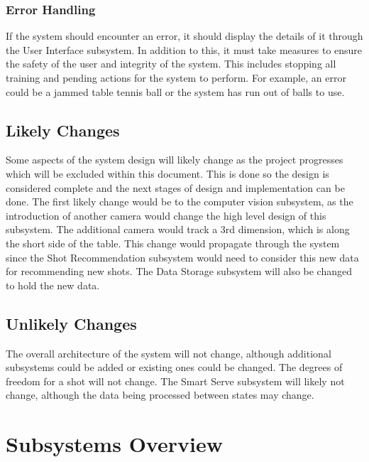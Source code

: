 \documentclass[11pt]{article}
\begin{document}
\subsubsection{Error Handling}
If the system should encounter an error, it should display the details of it through the User Interface subsystem. In addition to this, it must take measures to ensure the safety of the user and integrity of the system. This includes stopping all training and pending actions for the system to perform. For example, an error could be a jammed table tennis ball or the system has run out of balls to use.
\subsection{Likely Changes}
Some aspects of the system design will likely change as the project progresses which will be excluded within this document. This is done so the design is considered complete and the next stages of design and implementation can be done. The first likely change would be to the computer vision subsystem, as the introduction of another camera would change the high level design of this subsystem. The additional camera would track a 3rd dimension, which is along the short side of the table. This change would propagate through the system since the Shot Recommendation subsystem would need to consider this new data for recommending new shots. The Data Storage subsystem will also be changed to hold the new data.
\subsection{Unlikely Changes}
The overall architecture of the system will not change, although additional subsystems could be added or existing ones could be changed. The degrees of freedom for a shot will not change. The Smart Serve subsystem will likely not change, although the data being processed between states may change. 
\section{Subsystems Overview}
\end{document}
